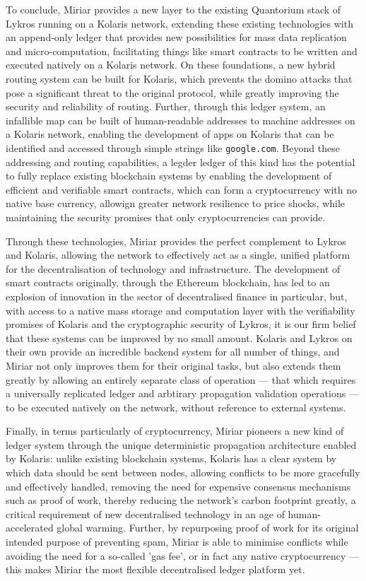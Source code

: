 \documentclass{extreport}
\begin{document}
To conclude, Miriar provides a new layer to the existing Quantorium stack of Lykros running on a Kolaris network, extending these existing technologies with an append-only ledger that provides new possibilities for mass data replication and micro-computation, facilitating things like smart contracts to be written and executed natively on a Kolaris network. On these foundations, a new hybrid routing system can be built for Kolaris, which prevents the domino attacks that pose a significant threat to the original protocol, while greatly improving the security and reliability of routing. Further, through this ledger system, an infallible map can be built of human-readable addresses to machine addresses on a Kolaris network, enabling the development of apps on Kolaris that can be identified and accessed through simple strings like \texttt{google.com}. Beyond these addressing and routing capabilities, a legder ledger of this kind has the potential to fully replace existing blockchain systems by enabling the development of efficient and verifiable smart contracts, which can form a cryptocurrency with no native base currency, allowign greater network resilience to price shocks, while maintaining the security promises that only cryptocurrencies can provide.

Through these technologies, Miriar provides the perfect complement to Lykros and Kolaris, allowing the network to effectively act as a single, unified platform for the decentralisation of technology and infrastructure. The development of smart contracts originally, through the Ethereum blockchain, has led to an explosion of innovation in the sector of decentralised finance in particular, but, with access to a native mass storage and computation layer with the verifiability promises of Kolaris and the cryptographic security of Lykros, it is our firm belief that these systems can be improved by no small amount. Kolaris and Lykros on their own provide an incredible backend system for all number of things, and Miriar not only improves them for their original tasks, but also extends them greatly by allowing an entirely separate class of operation --- that which requires a universally replicated ledger and arbtirary propagation validation operations --- to be executed natively on the network, without reference to external systems.

Finally, in terms particularly of cryptocurrency, Miriar pioneers a new kind of ledger system through the unique deterministic propagation architecture enabled by Kolaris: unlike existing blockchain systems, Kolaris has a clear system by which data should be sent between nodes, allowing conflicts to be more gracefully and effectively handled, removing the need for expensive consensus mechanisms such as proof of work, thereby reducing the network's carbon footprint greatly, a critical requirement of new decentralised technology in an age of human-accelerated global warming. Further, by repurposing proof of work for its original intended purpose of preventing spam, Miriar is able to minimise conflicts while avoiding the need for a so-called 'gas fee', or in fact any native cryptocurrency --- this makes Miriar the most flexible decentralised ledger platform yet.
\end{document}
